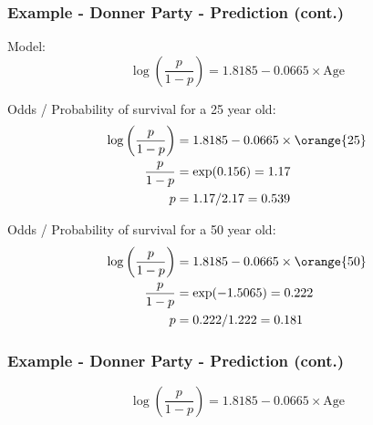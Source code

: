 
\begin{frame}
\frametitle{Example - Donner Party - Prediction (cont.)}

Model:
{\scriptsize
\[\log\left(\frac{p}{1-p}\right) = 1.8185-0.0665\times \text{Age}\]
}

Odds / Probability of survival for a 25 year old:
\pause
{\scriptsize
\begin{align*}
\log\left(\frac{p}{1-p}\right) &= 1.8185-0.0665\times \orange{25}\\
\frac{p}{1-p} &= \exp(0.156) = 1.17 \\
p &= 1.17/2.17 = 0.539 
\end{align*}
}

\pause

Odds / Probability of survival for a 50 year old:
\pause
{\scriptsize
\begin{align*}
\log\left(\frac{p}{1-p}\right) &= 1.8185-0.0665\times \orange{50}\\
\frac{p}{1-p} &= \exp(-1.5065) = 0.222 \\
p &= 0.222/1.222 =  0.181
\end{align*}
}

\end{frame}


\begin{frame}
\frametitle{Example - Donner Party - Prediction (cont.)}

{\scriptsize
\[\log\left(\frac{p}{1-p}\right) = 1.8185-0.0665\times \text{Age}\]
}

\vspace{-10mm}

\begin{center}
\end{center}
\end{frame}

